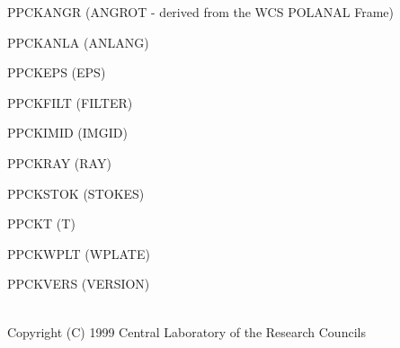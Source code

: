 \documentclass[twoside,11pt]{article}
\renewcommand{\_}{\texttt{\symbol{95}}}
\newcommand{\sstdiytopic}[2]{\item[{\hspace{-0.35em}#1\hspace{-0.35em}:}]
\mbox{} \\[1.3ex] #2}
\newcommand{\sstitem}{\item}
\newcommand{\sstdiytopic}[2]{\item[{#1}] #2 }
\newcommand{\sstitem}{\item}
\begin{document}
{{{         \sstitem
            PPCKANGR  (ANGROT - derived from the WCS POLANAL Frame)

         \sstitem
            PPCKANLA  (ANLANG)

         \sstitem
            PPCKEPS   (EPS)

         \sstitem
            PPCKFILT  (FILTER)

         \sstitem
            PPCKIMID  (IMGID)

         \sstitem
            PPCKRAY   (RAY)

         \sstitem
            PPCKSTOK  (STOKES)

         \sstitem
            PPCKT     (T)

         \sstitem
            PPCKWPLT  (WPLATE)

         \sstitem
            PPCKVERS  (VERSION)
      }
   }
   \sstdiytopic{
      Copyright
   }{
      Copyright (C) 1999 Central Laboratory of the Research Councils
   }
}
\end{document}
